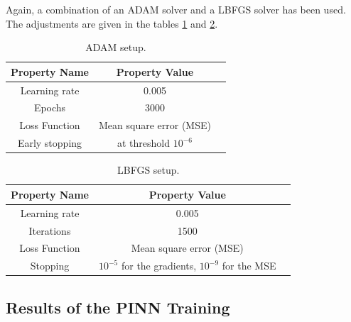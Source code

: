 \documentclass[a4paper,11pt]{article}
\begin{document}
Again, a combination of an ADAM solver and a LBFGS solver has been used. The adjustments are given in the tables \ref{AdamSetup2} and \ref{LBFGSSetup2}.

\begin{table}[htbp]
\centering
\begin{tabular}{ccl}
\toprule
\textbf{Property Name} & \textbf{Property Value}\\
\midrule
Learning rate & 0.005\\
Epochs & 3000 \\
Loss Function & Mean square error (MSE) \\
Early stopping & at threshold $10^{-6} $ \\
\bottomrule
\end{tabular}
\caption{ADAM setup.}
\label{AdamSetup2}
\end{table}

\begin{table}[h!]
\centering
\begin{tabular}{ccl}
\toprule
\textbf{Property Name} & \textbf{Property Value}\\
\midrule
Learning rate & 0.005\\
Iterations & 1500 \\
Loss Function & Mean square error (MSE) \\
Stopping & $10^{-5} $ for the gradients, $10^{-9} $ for the MSE\\
\bottomrule
\end{tabular}
\caption{LBFGS setup.}
\label{LBFGSSetup2}
\end{table}

\subsection*{Results of the PINN Training}
\end{document}
